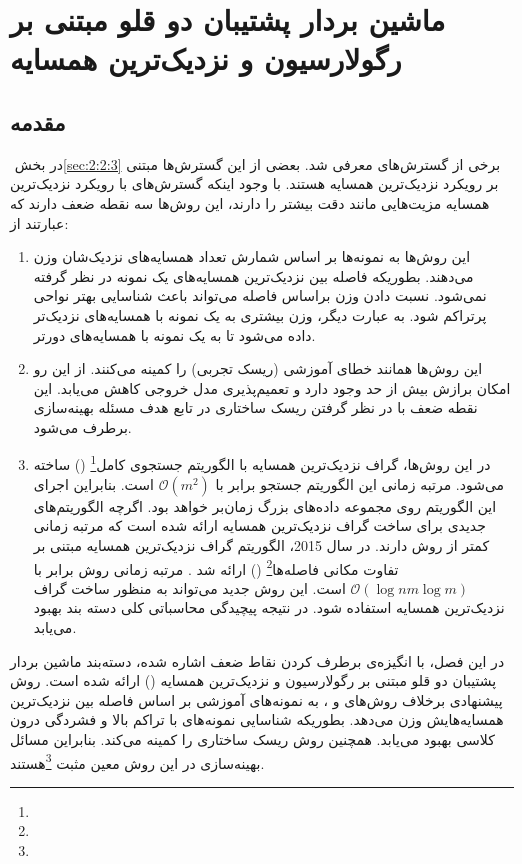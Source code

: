 
\chapter{ماشین بردار پشتیبان دو قلو مبتنی بر رگولارسیون و نزدیک‌ترین همسایه}\label{ch:4}
\section{مقدمه}\label{sec:4:1}
در بخش ‏\ref{sec:2:2:3} برخی از گسترش‌های  معرفی شد. بعضی از این گسترش‌ها مبتنی بر رویکرد نزدیک‌ترین همسایه هستند. با وجود اینکه گسترش‌های با رویکرد نزدیک‌ترین همسایه مزیت‌هایی مانند دقت بیشتر را دارند، این روش‌ها سه نقطه ضعف دارند که عبارتند از:
\begin{enumerate}
	\item این روش‌ها به نمونه‌ها بر اساس شمارش تعداد همسایه‌های نزدیک‌شان وزن می‌دهند. بطوریکه فاصله بین نزدیک‌ترین همسایه‌های یک نمونه در نظر گرفته نمی‌شود. نسبت دادن وزن براساس فاصله می‌تواند باعث شناسایی بهتر نواحی پرتراکم شود. به عبارت دیگر، وزن بیشتری به یک نمونه با همسایه‌های نزدیک‌تر داده می‌شود تا به یک نمونه با همسایه‌های دورتر.
	\item این روش‌ها همانند  خطای آموزشی (ریسک تجربی) را کمینه می‌کنند. از این رو امکان برازش بیش از حد وجود دارد و تعمیم‌پذیری مدل خروجی کاهش می‌یابد. این نقطه ضعف با در نظر گرفتن ریسک ساختاری در تابع هدف مسئله بهینه‌سازی برطرف می‌شود.
	\item در این روش‌ها، گراف نزدیک‌ترین همسایه با الگوریتم جستجوی کامل\footnote{}  () ساخته می‌شود. مرتبه زمانی این الگوریتم جستجو برابر با  $\mathcal{O}(m^2)$ است. بنابراین اجرای این الگوریتم روی مجموعه داده‌های بزرگ زمان‌بر خواهد بود. اگرچه الگوریتم‌های جدیدی برای ساخت گراف نزدیک‌ترین همسایه ارائه شده است که مرتبه زمانی کمتر از روش  دارند. در سال 2015، الگوریتم گراف نزدیک‌ترین همسایه مبتنی بر تفاوت مکانی فاصله‌ها\footnote{}  () ارائه شد \cite{xia2015}. مرتبه زمانی روش  برابر با $\mathcal{O}(\log nm\log m)$ است. این روش جدید می‌تواند به منظور ساخت گراف نزدیک‌ترین همسایه استفاده شود. در نتیجه پیچیدگی محاسباتی کلی دسته بند بهبود می‌یابد.
\end{enumerate} 

در این فصل، با انگیزه‌ی برطرف کردن نقاط ضعف اشاره شده، دسته‌بند ماشین بردار پشتیبان دو قلو مبتنی بر رگولارسیون و نزدیک‌ترین همسایه  () ارائه شده است. روش پیشنهادی برخلاف روش‌های  و ، به نمونه‌های آموزشی بر اساس فاصله بین نزدیک‌ترین همسایه‌هایش وزن می‌دهد. بطوریکه شناسایی نمونه‌های با تراکم بالا و فشردگی درون کلاسی بهبود می‌یابد. همچنین روش  ریسک ساختاری را کمینه می‌کند. بنابراین مسائل بهینه‌سازی در این روش معین مثبت  \footnote{}هستند.

